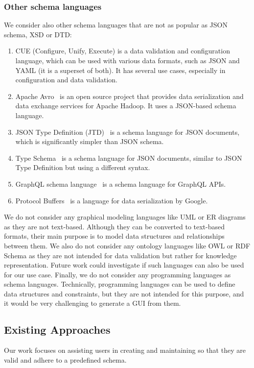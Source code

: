 \subsubsection{Other schema languages} %
We consider also other schema languages that are not as popular as JSON schema, XSD or DTD\@:
\begin{enumerate}[label=(\alph*)]
    \item CUE (Configure, Unify, Execute)\cite{cuelang} is a data validation and configuration language, which can be used with various data formats, such as JSON and YAML (it is a superset of both).
    It has several use cases, especially in configuration and data validation.
    \item Apache Avro~\cite{Apache-Avro} is an open source project that provides data serialization and data exchange services for Apache Hadoop.
    It uses a JSON-based schema language.
    \item JSON Type Definition (JTD)~\cite{rfc8927} is a schema language for JSON documents, which is significantly simpler than JSON schema.
    \item Type Schema~\cite{Kappestein_2023} is a schema language for JSON documents, similar to JSON Type Definition but using a different syntax.
    \item GraphQL schema language~\cite{graphQL} is a schema language for GraphQL APIs.
    \item Protocol Buffers~\cite{protobufProtocolBuffers} is a language for data serialization by Google.
\end{enumerate}

We do not consider any graphical modeling languages like UML or ER diagrams as they are not text-based.
Although they can be converted to text-based formats, their main purpose is to model data structures and relationships between them.
We also do not consider any ontology languages like OWL or RDF Schema as they are not intended for data validation but rather for knowledge representation.
Future work could investigate if such languages can also be used for our use case.
Finally, we do not consider any programming languages as schema languages.
Technically, programming languages can be used to define data structures and constraints, but they are not intended for this purpose, and it would be very challenging to generate a GUI from them.

\subsection{Existing Approaches}\label{subsec:existing-approaches}
Our work focuses on assisting users in creating and maintaining \cfgfiles{} so that they are valid and adhere to a predefined schema.

